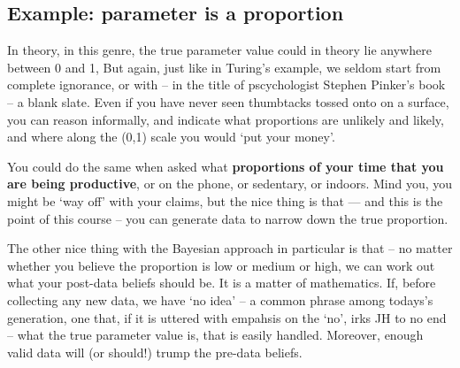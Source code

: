 \documentclass[]{book}
\begin{document}
\hypertarget{example-parameter-is-a-proportion}{%
\subsection{Example: parameter is a proportion}\label{example-parameter-is-a-proportion}}

In theory, in this genre, the true parameter value could in theory lie anywhere between 0 and 1, But again, just like in Turing's example, we seldom start from complete ignorance, or with -- in the title of pscychologist Stephen Pinker's book -- a blank slate. Even if you have never seen thumbtacks tossed onto on a surface, you can reason informally, and indicate what proportions are unlikely and likely, and where along the (0,1) scale you would `put your money'.

You could do the same when asked what \textbf{proportions of your time that you are being productive}, or on the phone, or sedentary, or indoors. Mind you, you might be `way off' with your claims, but the nice thing is that --- and this is the point of this course -- you can generate data to narrow down the true proportion.

The other nice thing with the Bayesian approach in particular is that -- no matter whether you believe the proportion is low or medium or high, we can work out what your post-data beliefs should be. It is a matter of mathematics. If, before collecting any new data, we have `no idea' -- a common phrase among todays's generation, one that, if it is uttered with empahsis on the `no', irks JH to no end -- what the true parameter value is, that is easily handled. Moreover, enough valid data will (or should!) trump the pre-data beliefs.
\end{document}

